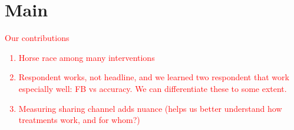 \documentclass[letterpaper, 12pt, parskip=full,DIV=10]{scrartcl}
\begin{document}


\clearpage


\section{Main}

\textcolor{red}{
Our contributions
\begin{enumerate}
\item Horse race among many interventions
\item Respondent works, not headline, and we learned two respondent that work especially well: FB vs accuracy. We can differentiate these to some extent. 
\item Measuring sharing channel adds nuance (helps us better understand how treatments work, and for whom?)
\end{enumerate}
}


\end{document}

